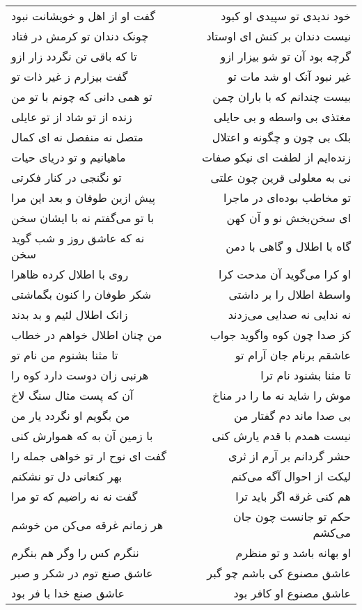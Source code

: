 \begin{center}
\begin{longtable}{l p{0.5cm} r}
\\
گفت او از اهل و خویشانت نبود
&&
خود ندیدی تو سپیدی او کبود
\\
چونک دندان تو کرمش در فتاد
&&
نیست دندان بر کنش ای اوستاد
\\
تا که باقی تن نگردد زار ازو
&&
گرچه بود آن تو شو بیزار ازو
\\
گفت بیزارم ز غیر ذات تو
&&
غیر نبود آنک او شد مات تو
\\
تو همی دانی که چونم با تو من
&&
بیست چندانم که با باران چمن
\\
زنده از تو شاد از تو عایلی
&&
مغتذی بی واسطه و بی حایلی
\\
متصل نه منفصل نه ای کمال
&&
بلک بی چون و چگونه و اعتلال
\\
ماهیانیم و تو دریای حیات
&&
زنده‌ایم از لطفت ای نیکو صفات
\\
تو نگنجی در کنار فکرتی
&&
نی به معلولی قرین چون علتی
\\
پیش ازین طوفان و بعد این مرا
&&
تو مخاطب بوده‌ای در ماجرا
\\
با تو می‌گفتم نه با ایشان سخن
&&
ای سخن‌بخش نو و آن کهن
\\
نه که عاشق روز و شب گوید سخن
&&
گاه با اطلال و گاهی با دمن
\\
روی با اطلال کرده ظاهرا
&&
او کرا می‌گوید آن مدحت کرا
\\
شکر طوفان را کنون بگماشتی
&&
واسطهٔ اطلال را بر داشتی
\\
زانک اطلال لئیم و بد بدند
&&
نه ندایی نه صدایی می‌زدند
\\
من چنان اطلال خواهم در خطاب
&&
کز صدا چون کوه واگوید جواب
\\
تا مثنا بشنوم من نام تو
&&
عاشقم برنام جان آرام تو
\\
هرنبی زان دوست دارد کوه را
&&
تا مثنا بشنود نام ترا
\\
آن که پست مثال سنگ لاخ
&&
موش را شاید نه ما را در مناخ
\\
من بگویم او نگردد یار من
&&
بی صدا ماند دم گفتار من
\\
با زمین آن به که هموارش کنی
&&
نیست همدم با قدم یارش کنی
\\
گفت ای نوح ار تو خواهی جمله را
&&
حشر گردانم بر آرم از ثری
\\
بهر کنعانی دل تو نشکنم
&&
لیکت از احوال آگه می‌کنم
\\
گفت نه نه راضیم که تو مرا
&&
هم کنی غرقه اگر باید ترا
\\
هر زمانم غرقه می‌کن من خوشم
&&
حکم تو جانست چون جان می‌کشم
\\
ننگرم کس را وگر هم بنگرم
&&
او بهانه باشد و تو منظرم
\\
عاشق صنع توم در شکر و صبر
&&
عاشق مصنوع کی باشم چو گبر
\\
عاشق صنع خدا با فر بود
&&
عاشق مصنوع او کافر بود
\\
\end{longtable}
\end{center}
